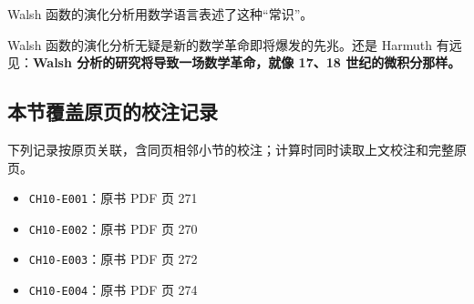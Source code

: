 \documentclass[
  10pt,
  fontset=fandol]{ctexart}
\providecommand{\tightlist}{%
  \setlength{\itemsep}{0pt}\setlength{\parskip}{0pt}}
\begin{document}
Walsh 函数的演化分析用数学语言表述了这种``常识''。

Walsh 函数的演化分析无疑是新的数学革命即将爆发的先兆。还是 Harmuth 有远见：\textbf{Walsh 分析的研究将导致一场数学革命，就像 17、18 世纪的微积分那样。}

\subsection{本节覆盖原页的校注记录}\label{ux672cux8282ux8986ux76d6ux539fux9875ux7684ux6821ux6ce8ux8bb0ux5f55}

下列记录按原页关联，含同页相邻小节的校注；计算时同时读取上文校注和完整原页。

\begin{itemize}
\tightlist
\item
  \texttt{CH10-E001}：原书 PDF 页 271
\item
  \texttt{CH10-E002}：原书 PDF 页 270
\item
  \texttt{CH10-E003}：原书 PDF 页 272
\item
  \texttt{CH10-E004}：原书 PDF 页 274
\end{itemize}
\end{document}
